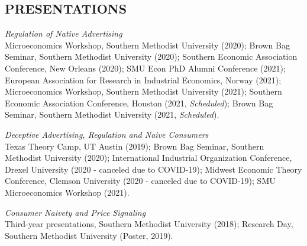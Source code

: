 \documentclass[11pt]{res}
\begin{document}
\begin{resume}
\section{PRESENTATIONS}\vspace{2mm}
\emph{Regulation of Native Advertising}\\
Microeconomics Workshop, Southern Methodist University (2020); Brown Bag Seminar, Southern Methodist University (2020); Southern Economic Association Conference, New Orleans (2020); SMU Econ PhD Alumni Conference (2021); European Association for Research in Industrial Economics, Norway (2021); Microeconomics Workshop, Southern Methodist University (2021); Southern Economic Association Conference, Houston (2021, {\emph{Scheduled}}); Brown Bag Seminar, Southern Methodist University (2021, {\emph{Scheduled}}).


\emph{Deceptive Advertising, Regulation and Naive Consumers}\\
Texas Theory Camp, UT Austin (2019); Brown Bag Seminar, Southern Methodist University (2020); International Industrial Organization Conference, Drexel University (2020 - canceled due to COVID-19); Midwest Economic Theory Conference, Clemson University (2020 - canceled due to COVID-19); SMU Microeconomics Workshop (2021).

\newpage
\phantom{.}\vspace{.4cm}


\emph{Consumer Naivety and Price Signaling}\\
Third-year presentations, Southern Methodist University (2018); Research Day, Southern Methodist University (Poster, 2019).



\end{resume}
\end{document}
